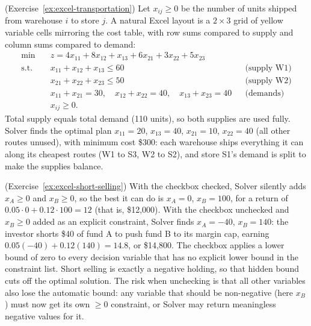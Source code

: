 \begin{solution}(Exercise~\ref{ex:excel-transportation})
Let $x_{ij} \geq 0$ be the number of units shipped from warehouse $i$ to store $j$.  A natural Excel layout is a $2 \times 3$ grid of yellow variable cells mirroring the cost table, with row sums compared to supply and column sums compared to demand:
\begin{align*}
\min \quad & z = 4x_{11} + 8x_{12} + x_{13} + 6x_{21} + 3x_{22} + 5x_{23}\\
\text{s.t.} \quad & x_{11} + x_{12} + x_{13} \leq 60 && \text{(supply W1)}\\
& x_{21} + x_{22} + x_{23} \leq 50 && \text{(supply W2)}\\
& x_{11} + x_{21} = 30, \quad x_{12} + x_{22} = 40, \quad x_{13} + x_{23} = 40 && \text{(demands)}\\
& x_{ij} \geq 0.
\end{align*}
Total supply equals total demand (110 units), so both supplies are used fully.  Solver finds the optimal plan $x_{11} = 20$, $x_{13} = 40$, $x_{21} = 10$, $x_{22} = 40$ (all other routes unused), with minimum cost \$300: each warehouse ships everything it can along its cheapest routes (W1 to S3, W2 to S2), and store S1's demand is split to make the supplies balance.
\end{solution}

\begin{solution}(Exercise~\ref{ex:excel-short-selling})
With the checkbox checked, Solver silently adds $x_A \geq 0$ and $x_B \geq 0$, so the best it can do is $x_A = 0$, $x_B = 100$, for a return of $0.05 \cdot 0 + 0.12 \cdot 100 = 12$ (that is, \$12{,}000).  With the checkbox unchecked and $x_B \geq 0$ added as an explicit constraint, Solver finds $x_A = -40$, $x_B = 140$: the investor shorts \$40 of fund A to push fund B to its margin cap, earning $0.05(-40) + 0.12(140) = 14.8$, or \$14{,}800.
The checkbox applies a lower bound of zero to every decision variable that has no explicit lower bound in the constraint list.  Short selling is exactly a negative holding, so that hidden bound cuts off the optimal solution.  The risk when unchecking is that all other variables also lose the automatic bound: any variable that should be non-negative (here $x_B$) must now get its own $\geq 0$ constraint, or Solver may return meaningless negative values for it.
\end{solution}

